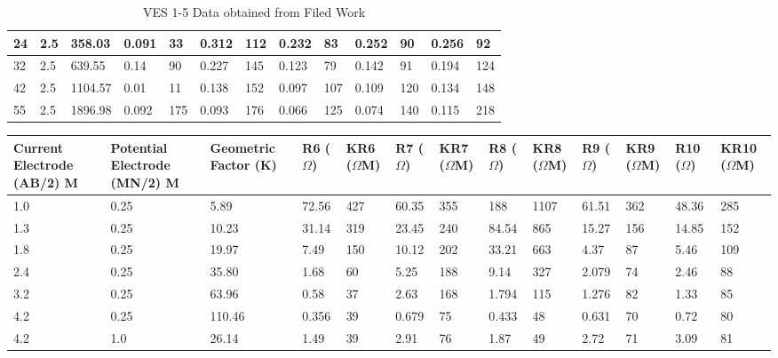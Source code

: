 \documentclass[12pt,a4paper]{report}
\begin{document}
\begin{table}[h!]
\begin{adjustbox}{max width=\textwidth}
\begin{tabular}{|p{2.5cm}|p{2.5cm}|p{2.5cm}|p{1.5cm}|p{1.8cm}|p{1.5cm}|p{1.8cm}|p{1.5cm}|p{1.8cm}|p{1.5cm}|p{1.8cm}|p{1.5cm}|p{1.8cm}|}
    24 & 2.5 & 358.03 & 0.091 & 33 & 0.312 & 112 & 0.232 & 83 & 0.252 & 90 & 0.256 & 92 \\ \hline
    32 & 2.5 & 639.55 & 0.14 & 90 & 0.227 & 145 & 0.123 & 79 & 0.142 & 91 & 0.194 & 124 \\ \hline
    42 & 2.5 & 1104.57 & 0.01 & 11 & 0.138 & 152 & 0.097 & 107 & 0.109 & 120 & 0.134 & 148 \\ \hline
    55 & 2.5 & 1896.98 & 0.092 & 175 & 0.093 & 176 & 0.066 & 125 & 0.074 & 140 & 0.115 & 218 \\ \hline
    \end{tabular}
    \end{adjustbox}
    \caption{VES 1-5 Data obtained from Filed Work}
    \label{tab:aah_ves-1-5}
\end{table}

\begin{table}[h!]
    \centering
    \begin{adjustbox}{max width=\textwidth}
    \renewcommand{\arraystretch}{1.5}
    \begin{tabular}{|p{2.5cm}|p{2.5cm}|p{2.5cm}|p{1.5cm}|p{1.8cm}|p{1.5cm}|p{1.8cm}|p{1.5cm}|p{1.8cm}|p{1.5cm}|p{1.8cm}|p{1.5cm}|p{1.8cm}|}
    \hline
    \textbf{Current Electrode (AB/2) M} & 
    \textbf{Potential Electrode (MN/2) M} & 
    \textbf{Geometric Factor (K)} & 
    \textbf{R6 ($\Omega$)} & 
    \textbf{KR6 ($\Omega$M)} & 
    \textbf{R7 ($\Omega$)} & 
    \textbf{KR7 ($\Omega$M)} & 
    \textbf{R8 ($\Omega$)} & 
    \textbf{KR8 ($\Omega$M)} & 
    \textbf{R9 ($\Omega$)} & 
    \textbf{KR9 ($\Omega$M)} & 
    \textbf{R10 ($\Omega$)} & 
    \textbf{KR10 ($\Omega$M)} \\ 
    \hline
    1.0 & 0.25 & 5.89 & 72.56 & 427 & 60.35 & 355 & 188 & 1107 & 61.51 & 362 & 48.36 & 285 \\ \hline
    1.3 & 0.25 & 10.23 & 31.14 & 319 & 23.45 & 240 & 84.54 & 865 & 15.27 & 156 & 14.85 & 152 \\ \hline
    1.8 & 0.25 & 19.97 & 7.49 & 150 & 10.12 & 202 & 33.21 & 663 & 4.37 & 87 & 5.46 & 109 \\ \hline
    2.4 & 0.25 & 35.80 & 1.68 & 60 & 5.25 & 188 & 9.14 & 327 & 2.079 & 74 & 2.46 & 88 \\ \hline
    3.2 & 0.25 & 63.96 & 0.58 & 37 & 2.63 & 168 & 1.794 & 115 & 1.276 & 82 & 1.33 & 85 \\ \hline
    4.2 & 0.25 & 110.46 & 0.356 & 39 & 0.679 & 75 & 0.433 & 48 & 0.631 & 70 & 0.72 & 80 \\ \hline
    4.2 & 1.0 & 26.14 & 1.49 & 39 & 2.91 & 76 & 1.87 & 49 & 2.72 & 71 & 3.09 & 81 \\ \hline

\end{tabular}
\end{adjustbox}
\end{table}
\end{document}
